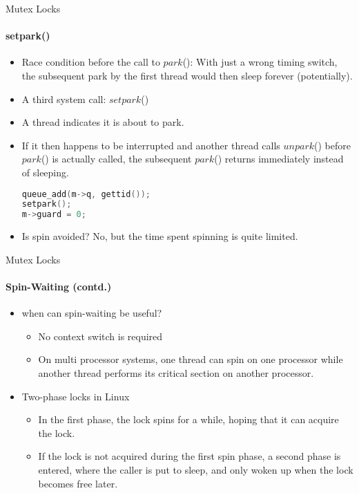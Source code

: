 \documentclass[10pt]{beamer}
\begin{document}
\begin{frame}[fragile]{Mutex Locks}
\framesubtitle{setpark()}
\begin{itemize}
 
\item Race condition before the call to $park$(): With just a wrong timing switch, the subsequent park by the first thread would then sleep forever (potentially).
\item A third system call: $setpark$()
\item A thread indicates it is about to park.
\item If it then happens to be interrupted and another thread calls $unpark$() before $park$() is actually called, the subsequent $park$() returns immediately instead of sleeping.
\vspace{6pt}\\
\begin{uncoverenv}
\begin{lstlisting}[language=C]
queue_add(m->q, gettid());
setpark();
m->guard = 0;
\end{lstlisting}
\end{uncoverenv}
\item Is spin avoided? No, but the time spent spinning is quite limited. 
\end{itemize}
\end{frame}

\begin{frame}{Mutex Locks}
\framesubtitle{Spin-Waiting (contd.)}
\begin{itemize}
 
\item when can spin-waiting be useful?
\begin{itemize}
\item No context switch is required 
\item On multi processor systems, one thread can spin on one processor while another thread performs its critical section on another processor. 
\end{itemize}
\item Two-phase locks in Linux
\begin{itemize}
\item In the first phase, the lock spins for a while, hoping that it can acquire the lock.
\item If the lock is not acquired during the first spin phase, a second phase is entered, where the caller is put to sleep, and only woken up when the lock becomes free later.
\end{itemize}
\end{itemize}
\end{frame}
\end{document}
